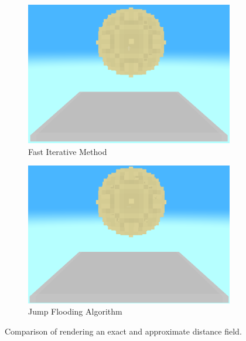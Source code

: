 \begin{figure}[htbp]
    \centering
    \begin{subfigure}[t]{0.49\textwidth}
        \centering
        \includegraphics[width=\textwidth]{figures/demo_fim.png}
        \caption{Fast Iterative Method}
    \end{subfigure}
    \hfill
    \begin{subfigure}[t]{0.49\textwidth}
        \centering
        \includegraphics[width=\textwidth]{figures/demo_jfa.png}
        \caption{Jump Flooding Algorithm}
    \end{subfigure}
    \caption{Comparison of rendering an exact and approximate distance field.}
    \label{fig:fim_jfa_comp}
\end{figure}

